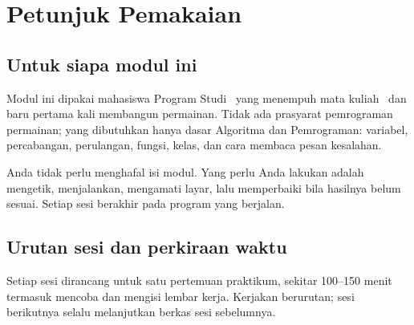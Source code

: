 
\section*{Petunjuk Pemakaian}

\subsection*{Untuk siapa modul ini}

Modul ini dipakai mahasiswa Program Studi \NamaProdi\ yang menempuh mata
kuliah \NamaMK\ dan baru pertama kali membangun permainan. Tidak ada
prasyarat pemrograman permainan; yang dibutuhkan hanya dasar Algoritma dan
Pemrograman: variabel, percabangan, perulangan, fungsi, kelas, dan cara
membaca pesan kesalahan.

Anda tidak perlu menghafal isi modul. Yang perlu Anda lakukan adalah
mengetik, menjalankan, mengamati layar, lalu memperbaiki bila hasilnya
belum sesuai. Setiap sesi berakhir pada program yang berjalan.

\subsection*{Urutan sesi dan perkiraan waktu}

Setiap sesi dirancang untuk satu pertemuan praktikum, sekitar 100--150 menit
termasuk mencoba dan mengisi lembar kerja. Kerjakan berurutan; sesi
berikutnya selalu melanjutkan berkas sesi sebelumnya.

